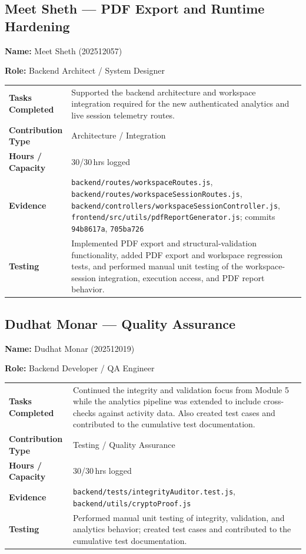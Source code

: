 \documentclass[11pt,a4paper]{article}
\newcommand{\field}[2]{\textbf{#1:} #2\par}
\begin{document}
\subsection{Meet Sheth --- PDF Export and Runtime Hardening}
\field{Name}{Meet Sheth (202512057)}
\field{Role}{Backend Architect / System Designer}
{\small
\begin{tabularx}{\textwidth}{>{\bfseries}p{}Y}
\toprule
Tasks Completed & Supported the backend architecture and workspace integration required for the new authenticated analytics and live session telemetry routes. \\
Contribution Type & Architecture / Integration \\
Hours / Capacity & 30/30\,hrs logged \\
Evidence & \texttt{backend/routes/workspaceRoutes.js}, \texttt{backend/routes/workspaceSessionRoutes.js}, \texttt{backend/controllers/workspaceSessionController.js}, \texttt{frontend/src/utils/pdfReportGenerator.js}; commits \texttt{94b8617a}, \texttt{705ba726} \\
Testing & Implemented PDF export and structural-validation functionality, added PDF export and workspace regression tests, and performed manual unit testing of the workspace-session integration, execution access, and PDF report behavior. \\
\bottomrule
\end{tabularx}
}

\subsection{Dudhat Monar --- Quality Assurance}
\field{Name}{Dudhat Monar (202512019)}
\field{Role}{Backend Developer / QA Engineer}
{\small
\begin{tabularx}{\textwidth}{>{\bfseries}p{}Y}
\toprule
Tasks Completed & Continued the integrity and validation focus from Module 5 while the analytics pipeline was extended to include cross-checks against activity data. Also created test cases and contributed to the cumulative test documentation. \\
Contribution Type & Testing / Quality Assurance \\
Hours / Capacity & 30/30\,hrs logged \\
Evidence & \texttt{backend/tests/integrityAuditor.test.js}, \texttt{backend/utils/cryptoProof.js} \\
Testing & Performed manual unit testing of integrity, validation, and analytics behavior; created test cases and contributed to the cumulative test documentation. \\
\bottomrule
\end{tabularx}
}
\end{document}
